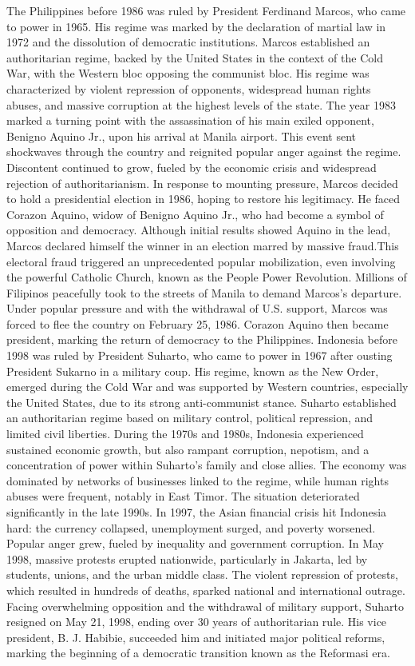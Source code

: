\documentclass[12pt]{article}
\begin{document}
The Philippines before 1986 was ruled by President Ferdinand Marcos, who came to power in 1965. His regime was marked by the declaration of martial law in 1972 and the dissolution of democratic institutions. Marcos established an authoritarian regime, backed by the United States in the context of the Cold War, with the Western bloc opposing the communist bloc. His regime was characterized by violent repression of opponents, widespread human rights abuses, and massive corruption at the highest levels of the state. The year 1983 marked a turning point with the assassination of his main exiled opponent, Benigno Aquino Jr., upon his arrival at Manila airport. This event sent shockwaves through the country and reignited popular anger against the regime. Discontent continued to grow, fueled by the economic crisis and widespread rejection of authoritarianism. In response to mounting pressure, Marcos decided to hold a presidential election in 1986, hoping to restore his legitimacy. He faced Corazon Aquino, widow of Benigno Aquino Jr., who had become a symbol of opposition and democracy. Although initial results showed Aquino in the lead, Marcos declared himself the winner in an election marred by massive fraud.This electoral fraud triggered an unprecedented popular mobilization, even involving the powerful Catholic Church, known as the People Power Revolution. Millions of Filipinos peacefully took to the streets of Manila to demand Marcos’s departure. Under popular pressure and with the withdrawal of U.S. support, Marcos was forced to flee the country on February 25, 1986. Corazon Aquino then became president, marking the return of democracy to the Philippines.
Indonesia before 1998 was ruled by President Suharto, who came to power in 1967 after ousting President Sukarno in a military coup. His regime, known as the New Order, emerged during the Cold War and was supported by Western countries, especially the United States, due to its strong anti-communist stance. Suharto established an authoritarian regime based on military control, political repression, and limited civil liberties. During the 1970s and 1980s, Indonesia experienced sustained economic growth, but also rampant corruption, nepotism, and a concentration of power within Suharto’s family and close allies. The economy was dominated by networks of businesses linked to the regime, while human rights abuses were frequent, notably in East Timor. The situation deteriorated significantly in the late 1990s. In 1997, the Asian financial crisis hit Indonesia hard: the currency collapsed, unemployment surged, and poverty worsened. Popular anger grew, fueled by inequality and government corruption. In May 1998, massive protests erupted nationwide, particularly in Jakarta, led by students, unions, and the urban middle class. The violent repression of protests, which resulted in hundreds of deaths, sparked national and international outrage. Facing overwhelming opposition and the withdrawal of military support, Suharto resigned on May 21, 1998, ending over 30 years of authoritarian rule. His vice president, B. J. Habibie, succeeded him and initiated major political reforms, marking the beginning of a democratic transition known as the Reformasi era.
\end{document}
